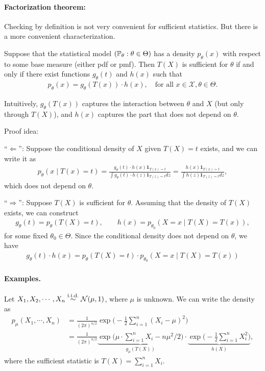 \documentclass[11pt,letterpaper]{article}
\numberwithin{assumption}{lecture}
\numberwithin{theorem}{lecture}
\numberwithin{proposition}{lecture}
\numberwithin{lemma}{lecture}
\numberwithin{claim}{lecture}
\numberwithin{corollary}{lecture}
\numberwithin{definition}{lecture}
\numberwithin{conjecture}{lecture}
\numberwithin{remark}{lecture}
\numberwithin{example}{lecture}
\numberwithin{equation}{lecture}
\begin{document}
\paragraph{Factorization theorem:} Checking by definition is not very convenient for sufficient statistics. But there is a more convenient characterization.
\begin{theorem}
  Suppose that the statistical model $({\mathbb{P}}_\theta: \theta \in \Theta)$ has a density $p_\theta (x)$ with respect to some base measure (either pdf or pmf). Then $T(X)$ is sufficient for $\theta$ if and only if there exist functions $g_\theta (t)$ and $h(x)$ such that
  \begin{align*}
    p_\theta (x) = g_\theta (T(x)) \cdot h(x), \quad \text{for all } x \in \mathcal{X}, \theta \in \Theta.
  \end{align*}
\end{theorem}
Intuitively, $g_\theta (T (x))$ captures the interaction between $\theta$ and $X$ (but only through $T(X)$), and $h(x)$ captures the part that does not depend on $\theta$.

\bigskip

Proof idea:

``$\Leftarrow$'': Suppose the conditional density of $X$ given $T(X) = t$ exists, and we can write it as
\begin{align*}
  p_\theta (x \mid T (x) = t) = \frac{g_\theta (t) \cdot h (x) \bm{1}_{T (x) = t}}{\int g_\theta (t) \cdot h (z) \bm{1}_{T (z) = t} dz} = \frac{h (x) \bm{1}_{T (x) = t}}{\int  h (z) \bm{1}_{T (z) = t} dz},
\end{align*}
which does not depend on $\theta$.

``$\Rightarrow$'': Suppose $T (X)$ is sufficient for $\theta$. Assuming that the density of $T(X)$ exists, we can construct
\begin{align*}
  g_\theta (t) = p_\theta (T(X) = t), \qquad h(x) = p_{\theta_0} (X = x \mid T(X) = T(x)),
\end{align*}
for some fixed $\theta_0 \in \Theta$. Since the conditional density does not depend on $\theta$, we have
\begin{align*}
   g_\theta (t) \cdot h(x) = p_\theta (T(X) = t) \cdot  p_{\theta_0} (X = x \mid T(X) = T(x))
\end{align*}

\paragraph{Examples.} Let $X_1, X_2, \cdots, X_n \overset{\mathrm{i.i.d.}}{\sim} \mathcal{N} (\mu, 1)$, where $\mu$ is unknown. We can write the density as
\begin{align*}
  p_\mu (X_1, \cdots, X_n) &= \frac{1}{(2\pi)^{n/2}} \exp \Big( - \frac{1}{2} \sum_{i=1}^n (X_i - \mu)^2 \Big)\\
  &= \frac{1}{(2\pi)^{n/2}} \underbrace{\exp \Big( \mu \cdot \sum_{i=1}^n X_i - n \mu^2 / 2 \Big)}_{ g_\mu (T (X))} \cdot \underbrace{\exp \Big( - \frac{1}{2} \sum_{i=1}^n X_i^2 \Big)}_{h (X)},
\end{align*}
where the sufficient statistic is $T(X) = \sum_{i=1}^n X_i$.
\end{document}

